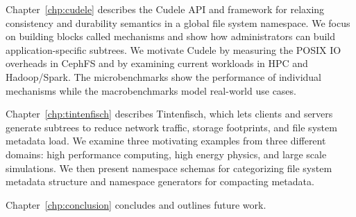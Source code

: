 Chapter~\ref{chp:cudele} describes the Cudele API and framework for relaxing
consistency and durability semantics in a global file system namespace. We
focus on building blocks called mechanisms and show how administrators can
build application-specific subtrees.  We motivate Cudele by measuring the POSIX
IO overheads in CephFS and by examining current workloads in HPC and
Hadoop/Spark. The microbenchmarks show the performance of individual mechanisms
while the macrobenchmarks model real-world use cases.

Chapter~\ref{chp:tintenfisch} describes Tintenfisch, which lets clients and
servers generate subtrees to reduce network traffic, storage footprints, and
file system metadata load. We examine three motivating examples from three
different domains: high performance computing, high energy physics, and large
scale simulations. We then present namespace schemas for categorizing file
system metadata structure and namespace generators for compacting metadata.

Chapter~\ref{chp:conclusion} concludes and outlines future work.

